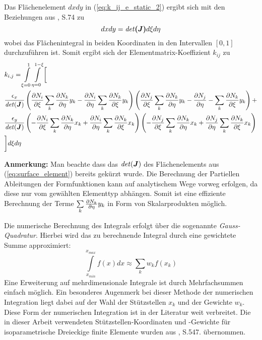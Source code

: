 Das Flächenelement $dxdy$ in (\ref{eq:k_ij_e_static_2}) ergibt sich mit den Beziehungen aus \cite{SMS_VO_skript}, S.74 zu 
\begin{equation}
\label{eq:surface_element}
dxdy = \mathit{det} \boldsymbol{(J)} d\xi d\eta
\end{equation}
wobei das Flächenintegral in beiden Koordinaten in den Intervallen $[0,1]$ durchzuführen ist. Somit ergibt sich der Elementmatrix-Koeffizient $k_{ij}$ zu 
\begin{align}
&k_{i,j} = \int\displaylimits_{\xi = 0}^{1} \int\displaylimits_{\eta = 0}^{1 - \xi} \bigg[\\
%
&\frac{\epsilon_x}{\mathit{det}(\mat{J})}\left(\parDiff{N_i}{\xi}\sum\limits_{k}\parDiff{N_k}{\eta}y_k - \parDiff{N_i}{\eta}\sum\limits_{k}\parDiff{N_k}{\xi}y_k\right)
%
\left(\parDiff{N_j}{\xi}\sum\limits_{k}\parDiff{N_k}{\eta}y_k - \parDiff{N_j}{\eta} -\sum\limits_{k}\parDiff{N_k}{\xi}y_k\right) + \nonumber\\ 
%
&\frac{\epsilon_y}{\mathit{det}(\mat{J})}\left(-\parDiff{N_i}{\xi}\sum\limits_{k}\parDiff{N_k}{\eta}x_k + \parDiff{N_i}{\eta} \sum\limits_{k}\parDiff{N_k}{\xi}x_k\right)
%
\left(-\parDiff{N_j}{\xi}\sum\limits_{k}\parDiff{N_k}{\eta}x_k + \parDiff{N_j}{\eta} \sum\limits_{k}\parDiff{N_k}{\xi}x_k\right) \nonumber\\ 
& \bigg]d\xi d\eta
\end{align}

\textbf{Anmerkung:} Man beachte dass das $\mathit{det}(\boldsymbol{J})$ des Flächenelements aus (\ref{eq:surface_element}) bereits gekürzt wurde.\newline
Die Berechnung der Partiellen Ableitungen der Formfunktionen kann auf analytischem Wege vorweg erfolgen, da diese nur vom gewählten Elementtyp abhängen. Somit ist eine effiziente Berechnung der Terme $\sum\limits_{k}\frac{\partial N_k}{\partial \eta}y_k$ in Form von Skalarprodukten möglich.\newline

Die numerische Berechnung des Integrals erfolgt über die sogenannte \textit{Gauss-Quadratur}. Hierbei wird das zu berechnende Integral durch eine gewichtete Summe approximiert:
\begin{equation}
\int\limits_{x_{min}}^{x_{max}} f(x) dx \approx \sum\limits_{k}w_kf(x_k)
\end{equation}
Eine Erweiterung auf mehrdimensionale Integrale ist durch Mehrfachsummen einfach möglich. Ein besonderes Augenmerk bei dieser Methode der numerischen Integration liegt dabei auf der Wahl der Stützstellen $x_k$ und der Gewichte $w_k$. Diese Form der numerischen Integration ist in der Literatur weit verbreitet. Die in dieser Arbeit verwendeten Stützstellen-Koordinaten und -Gewichte für isoparametrische Dreieckige finite Elemente wurden aus \cite{bathe}, S.547. übernommen. \newline


